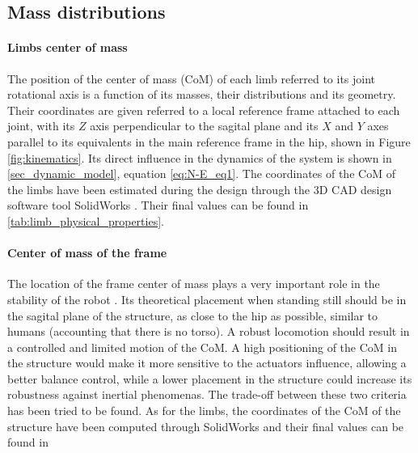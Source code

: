\vfill
\subsection{Mass distributions} %
\label{sub:centers_of_mass}

\paragraph{Limbs center of mass} %
\label{par:limbs_center_of_mass}
The position of the center of mass (CoM) of each limb referred to its joint rotational axis is a function of its masses, their distributions and its geometry.
Their coordinates are given referred to a local reference frame attached to each joint, with its $Z$ axis perpendicular to the sagital plane and its $X$ and $Y$ axes parallel to its equivalents in the main reference frame in the hip, shown in Figure \ref{fig:kinematics}.
Its direct influence in the dynamics of the system is shown in \ref{sec_dynamic_model}, equation \ref{eq:N-E_eq1}.
The coordinates of the CoM of the limbs have been estimated during the design through the 3D CAD design software tool SolidWorks \cite{solidworks}.
Their final values can be found in \ref{tab:limb_physical_properties}.


\paragraph{Center of mass of the frame} %
\label{par:center_of_mass_of_the_frame}
The location of the frame center of mass plays a very important role in the stability of the robot \cite{rojas}.
Its theoretical placement when standing still should be in the sagital plane of the structure, as close to the hip as possible, similar to humans (accounting that there is no torso).
A robust locomotion should result in a controlled and limited motion of the CoM. 
A high positioning of the CoM in the structure would make it more sensitive to the actuators influence, allowing a better balance control, while a lower placement in the structure could increase its robustness against inertial phenomenas.
The trade-off between these two criteria has been tried to be found.
As for the limbs, the coordinates of the CoM of the structure have been computed through SolidWorks and their final values can be found in %

